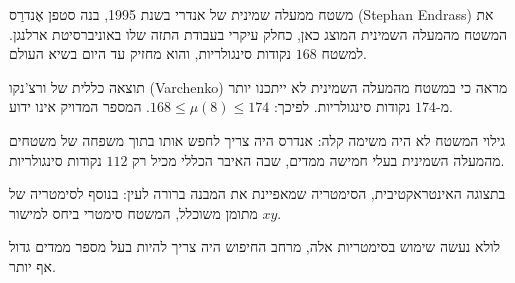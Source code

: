\begin{surferPage}{משטח ממעלה שמינית של אנדרי}
     בשנת 1995, בנה סטפן אֶנדרַס (Stephan Endrass) את המשטח מהמעלה השמינית המוצג כאן, כחלק 
    עיקרי בעבודת התזה שלו באוניברסיטת ארלנגן.
    למשטח $168$ נקודות סינגולריות, והוא מחזיק עד היום בשיא
    העולם. 
  
     תוצאה כללית של ורצ'נקו (Varchenko) מראה כי במשטח מהמעלה השמינית לא ייתכנו יותר
    מ-$174$ נקודות סינגולריות.
    לפיכך: $168 \le \mu(8) \le 174$. 
    המספר המדויק אינו ידוע.

     גילוי המשטח לא היה משימה קלה: אנדרס היה צריך לחפש אותו
    בתוך משפחה של משטחים מהמעלה השמינית בעלי חמישה ממדים, שבה האיבר הכללי
    מכיל רק $112$ נקודות סינגולריות.

    בתצוגה האינטראקטיבית, הסימטריה שמאפיינת את המבנה ברורה לעין: 
    בנוסף לסימטריה של מתומן משוכלל, המשטח סימטרי
    ביחס למישור $xy$.

    לולא נעשה שימוש בסימטריות אלה, מרחב החיפוש היה צריך להיות בעל
    מספר ממדים גדול אף יותר.
\end{surferPage}
